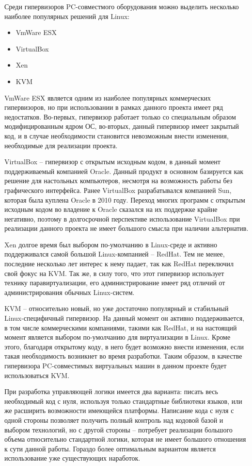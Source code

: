 Среди гипервизоров PC-совместмого оборудования можно выделить несколько наиболее
популярных решений для Linux:
\begin{itemize}
    \item VmWare ESX
    \item VirtualBox
    \item Xen
    \item KVM
\end{itemize}

VmWare ESX является одним из наиболее популярных коммерческих гипервизоров, но при 
использовании в рамках данного проекта имеет ряд недостатков. Во-первых, гипервизор
работает только со специальным образом модифицированным ядром ОС, во-вторых,
данный гипервизор имеет закрытый код, и в случае необходимости становится невозможным
внести изменения, необходимые для реализации проекта.

VirtualBox -- гипервизор с открытым исходным кодом, в данный момент поддерживаемый 
компанией Oracle. Данный продукт в основном базируется как решение для настольных
компьютеров, несмотря на возможность работы без графического интерфейса.
Ранее VirtualBox разрабатывался компанией Sun, которая была куплена Oracle в 2010 году.
Переход многих программ с открытым исходным кодом во владение к Oracle сказался на
их поддержке крайне негативно, поэтому в долгосрочной перспективе использование
VirtualBox при реализации данного проекта не имеет большого смысла при наличии альтернатив.

Xen долгое время был выбором по-умолчанию в Linux-среде и активно поддерживался
самой большой Linux-компанией -- RedHat. %
Тем не менее, последние несколько лет интерес к нему падает, так как
RedHat переключил свой фокус на KVM. Так же, в силу того, что этот гипервизор 
использует технику паравиртуализации, его администрирование имеет ряд отличий
от администрирования обычных Linux-систем.

KVM -- относительно новый, но уже достаточно популярный и стабильный Linux-специфичный
гипервизор. На данный момент он активно поддерживается, в том числе коммерческими компаниями,
такими как RedHat, и на настоящий момент является выбором по-умолчанию для виртуализации в 
Linux. Кроме этого, благодаря открытому коду, в него будет возможно внести изменения,
если такая необходимость возникнет во время разработки.
Таким образом, в качестве гипервизора PC-совместимых виртуальных машин в данном проекте
будет использоваться KVM.

При разработка управляющей логики имеется два варианта: писать весь необходимый код с нуля, 
используя только стандартные библиотеки языков, или же расширить возможности имеющейся
платформы. Написание кода с нуля с одной стороны позволяет получить полный контроль 
над кодовой базой и выбором технологий, но с другой стороны -- потребует реализации
большого объема относительно стандартной логики, которая не имеет большого отношения 
к сути данной работы. Гораздо более оптимальным вариантом является использование уже 
существующих наработок.

